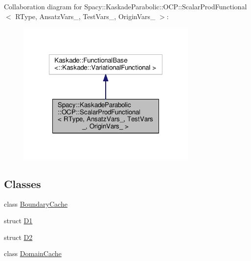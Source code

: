 Collaboration diagram for Spacy\-:\-:Kaskade\-Parabolic\-:\-:O\-C\-P\-:\-:Scalar\-Prod\-Functional$<$ R\-Type, Ansatz\-Vars\-\_\-, Test\-Vars\-\_\-, Origin\-Vars\-\_\- $>$\-:
\nopagebreak
\begin{figure}[H]
\begin{center}
\leavevmode
\includegraphics[width=252pt]{classSpacy_1_1KaskadeParabolic_1_1OCP_1_1ScalarProdFunctional__coll__graph}
\end{center}
\end{figure}
\subsection*{Classes}
\begin{DoxyCompactItemize}
\item 
class \hyperlink{classSpacy_1_1KaskadeParabolic_1_1OCP_1_1ScalarProdFunctional_1_1BoundaryCache}{Boundary\-Cache}
\item 
struct \hyperlink{structSpacy_1_1KaskadeParabolic_1_1OCP_1_1ScalarProdFunctional_1_1D1}{D1}
\item 
struct \hyperlink{structSpacy_1_1KaskadeParabolic_1_1OCP_1_1ScalarProdFunctional_1_1D2}{D2}
\item 
class \hyperlink{classSpacy_1_1KaskadeParabolic_1_1OCP_1_1ScalarProdFunctional_1_1DomainCache}{Domain\-Cache}
\end{DoxyCompactItemize}
